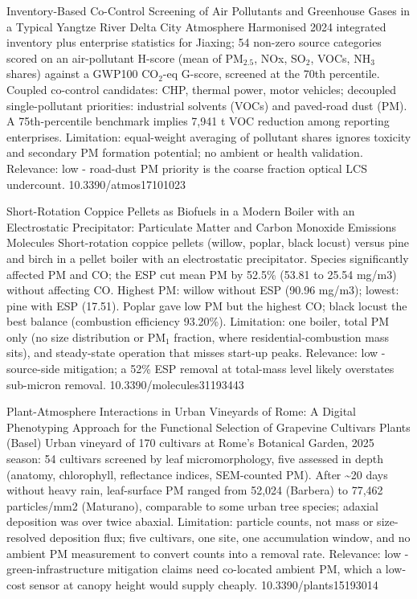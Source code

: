\documentclass[10pt]{article}
\begin{document}
\par{}\baselineskip{}\baselineskip
{}

{Inventory-Based Co-Control Screening of Air Pollutants and Greenhouse Gases in a Typical Yangtze River Delta City}
{Atmosphere}
{Harmonised 2024 integrated inventory plus enterprise statistics for Jiaxing; 54 non-zero source categories scored on an air-pollutant H-score (mean of PM$_{2.5}$, NOx, SO$_2$, VOCs, NH$_3$ shares) against a GWP100 CO$_2$-eq G-score, screened at the 70th percentile. Coupled co-control candidates: CHP, thermal power, motor vehicles; decoupled single-pollutant priorities: industrial solvents (VOCs) and paved-road dust (PM). A 75th-percentile benchmark implies 7,941 t VOC reduction among reporting enterprises. Limitation: equal-weight averaging of pollutant shares ignores toxicity and secondary PM formation potential; no ambient or health validation. Relevance: low - road-dust PM priority is the coarse fraction optical LCS undercount.}
{10.3390/atmos17101023}

{Short-Rotation Coppice Pellets as Biofuels in a Modern Boiler with an Electrostatic Precipitator: Particulate Matter and Carbon Monoxide Emissions}
{Molecules}
{Short-rotation coppice pellets (willow, poplar, black locust) versus pine and birch in a pellet boiler with an electrostatic precipitator. Species significantly affected PM and CO; the ESP cut mean PM by 52.5\% (53.81 to 25.54 mg/m3) without affecting CO. Highest PM: willow without ESP (90.96 mg/m3); lowest: pine with ESP (17.51). Poplar gave low PM but the highest CO; black locust the best balance (combustion efficiency 93.20\%). Limitation: one boiler, total PM only (no size distribution or PM$_{1}$ fraction, where residential-combustion mass sits), and steady-state operation that misses start-up peaks. Relevance: low - source-side mitigation; a 52\% ESP removal at total-mass level likely overstates sub-micron removal.}
{10.3390/molecules31193443}

{Plant-Atmosphere Interactions in Urban Vineyards of Rome: A Digital Phenotyping Approach for the Functional Selection of Grapevine Cultivars}
{Plants (Basel)}
{Urban vineyard of 170 cultivars at Rome's Botanical Garden, 2025 season: 54 cultivars screened by leaf micromorphology, five assessed in depth (anatomy, chlorophyll, reflectance indices, SEM-counted PM). After \textasciitilde{}20 days without heavy rain, leaf-surface PM ranged from 52,024 (Barbera) to 77,462 particles/mm2 (Maturano), comparable to some urban tree species; adaxial deposition was over twice abaxial. Limitation: particle counts, not mass or size-resolved deposition flux; five cultivars, one site, one accumulation window, and no ambient PM measurement to convert counts into a removal rate. Relevance: low - green-infrastructure mitigation claims need co-located ambient PM, which a low-cost sensor at canopy height would supply cheaply.}
{10.3390/plants15193014}
\end{document}
